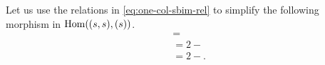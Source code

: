 \begin{example}
    Let us use the relations in \eqref{eq:one-col-sbim-rel} to simplify the following morphism in $\operatorname{Hom}((s,s),(s))$.
    \begin{align*}
        
         & = 
        \\ & = 2  - 
        \\ & = 2  - .
    \end{align*}
\end{example}

